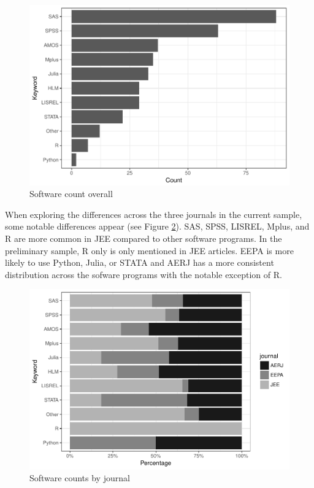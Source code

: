 \documentclass[english,man]{apa6}
\theoremstyle{definition}
\theoremstyle{definition}
\theoremstyle{remark}
\begin{document}
\begin{figure}[htbp]
\centering
\includegraphics{aera_proposal_files/figure-latex/count-software-1.pdf}
\caption{\label{fig:count-software}Software count overall}
\end{figure}

When exploring the differences across the three journals in the current
sample, some notable differences appear (see Figure
\ref{fig:software-journal}). SAS, SPSS, LISREL, Mplus, and R are more
common in JEE compared to other software programs. In the preliminary
sample, R only is only mentioned in JEE articles. EEPA is more likely to
use Python, Julia, or STATA and AERJ has a more consistent distribution
across the sofware programs with the notable exception of R.

\begin{figure}[htbp]
\centering
\includegraphics{aera_proposal_files/figure-latex/software-journal-1.pdf}
\caption{\label{fig:software-journal}Software counts by journal}
\end{figure}
\end{document}

